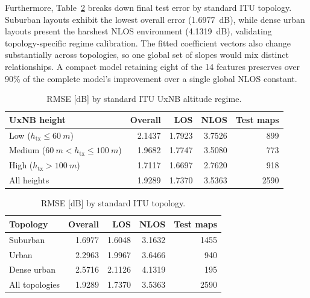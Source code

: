 \documentclass[10pt,conference,letterpaper]{IEEEtran}
\begin{document}
Furthermore, Table~\ref{tab:itu-topology} breaks down final test error by
standard ITU topology. Suburban layouts exhibit the lowest overall error
(\SI{1.6977}{dB}), while dense urban layouts present the harshest NLOS
environment (\SI{4.1319}{dB}), validating topology-specific regime
calibration. The fitted coefficient vectors also change substantially across
topologies, so one global set of slopes would mix distinct relationships. A
compact model retaining eight of the 14 features preserves over 90\% of the
complete model's improvement over a single global NLOS constant.

\begin{table}[t]
\centering
\caption{RMSE [dB] by standard ITU UxNB altitude regime.}
\label{tab:height}
\scriptsize
\setlength{\tabcolsep}{3.5pt}
\begin{tabular}{lrrrr}
\toprule
UxNB height & Overall & LOS & NLOS & Test maps \\
\midrule
Low ($h_{\mathrm{tx}}\le\SI{60}{m}$) & 2.1437 & 1.7923 & 3.7526 & 899 \\
Medium ($\SI{60}{m}<h_{\mathrm{tx}}\le\SI{100}{m}$) & 1.9682 & 1.7747 & 3.5080 & 773 \\
High ($h_{\mathrm{tx}}>\SI{100}{m}$) & 1.7117 & 1.6697 & 2.7620 & 918 \\
\midrule
All heights & 1.9289 & 1.7370 & 3.5363 & 2590 \\
\bottomrule
\end{tabular}
\end{table}

\begin{table}[t]
\centering
\caption{RMSE [dB] by standard ITU topology.}
\label{tab:itu-topology}
\scriptsize
\setlength{\tabcolsep}{3.5pt}
\begin{tabular}{lrrrr}
\toprule
Topology & Overall & LOS & NLOS & Test maps \\
\midrule
Suburban & 1.6977 & 1.6048 & 3.1632 & 1455 \\
Urban & 2.2963 & 1.9967 & 3.6466 & 940 \\
Dense urban & 2.5716 & 2.1126 & 4.1319 & 195 \\
\midrule
All topologies & 1.9289 & 1.7370 & 3.5363 & 2590 \\
\bottomrule
\end{tabular}
\end{table}
\end{document}
